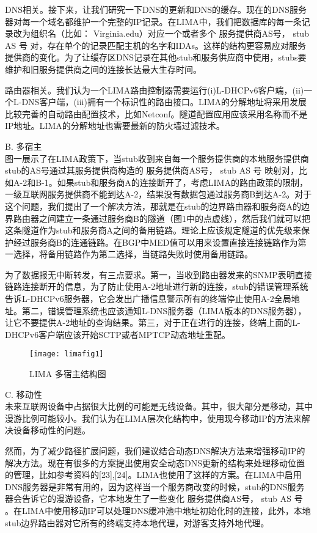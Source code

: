 DNS相关。接下来，让我们研究一下DNS的更新和DNS的缓存。现在的DNS服务器对每一个域名都维护一个完整的IP记录。在LIMA中，我们把数据库的每一条记录改为组织名（比如： Virginia.edu）对应一个或者多个 { 服务提供商AS号， stub AS 号 } 对，存在单个的记录匹配主机的名字和IDAs。这样的结构更容易应对服务提供商的变化。为了让缓存区DNS记录在其他stub和服务供应商中使用，stubs要维护和旧服务提供商之间的连接长达最大生存时间。

路由器相关。我们认为一个LIMA路由控制器需要运行(i)L-DHCPv6客户端，(ii)一个L-DNS客户端，(iii)拥有一个标识性的路由接口。LIMA的分解地址将采用发展比较完善的自动路由配置技术，比如Netconf。隧道配置应用应该采用名称而不是IP地址。LIMA的分解地址也需要最新的防火墙过滤技术。


B.	多宿主 \\
图一展示了在LIMA政策下，当stub收到来自每一个服务提供商的本地服务提供商stub的AS号通过其服务提供商构造的{ 服务提供商AS号， stub AS 号 } 映射对，比如A-2和B-1。如果stub和服务商A的连接断开了，考虑LIMA的路由政策的限制，一级互联网服务提供商不能到达A-2，结果没有数据包通过服务商B到达A-2。对于这个问题，我们提出了一个解决方法，那就是在stub的边界路由器和服务商A的边界路由器之间建立一条通过服务商B的隧道（图1中的点虚线），然后我们就可以把这条隧道作为stub和服务商A之间的备用链路。理论上应该规定隧道的优先级来保护经过服务商B的连通链路。在BGP中MED值可以用来设置直接连接链路作为第一选择，将备用链路作为第二选择，当链路失败时使用备用链路。


为了数据报无中断转发，有三点要求。第一，当收到路由器发来的SNMP表明直接链路连接断开的信息，为了防止使用A-2地址进行新的连接，stub的错误管理系统告诉L-DHCPv6服务器，它会发出广播信息警示所有的终端停止使用A-2全局地址。第二，错误管理系统也应该通知L-DNS服务器（LIMA版本的DNS服务器），让它不要提供A-2地址的查询结果。第三，对于正在进行的连接，终端上面的L-DHCPv6客户端应该开始SCTP或者MPTCP动态地址重配。

\begin{figure}
  \centering
  \texttt{[image: limafig1]}\\
  \caption{LIMA 多宿主结构图}\label{fig:limafig1}
\end{figure}

C.	移动性\\
未来互联网设备中占据很大比例的可能是无线设备。其中，很大部分是移动，其中漫游比例可能较小。我们认为在LIMA层次化结构中，使用现今移动IP的方法来解决设备移动性的问题。


然而，为了减少路径扩展问题，我们建议结合动态DNS解决方法来增强移动IP的解决方法。现在有很多的方案提出使用安全动态DNS更新的结构来处理移动位置的管理，比如参考资料的[23],[24]。LIMA也使用了这样的方案。在LIMA中启用DNS服务器是非常有用的，因为这样当一个服务商改变的时候，stub的DNS服务器会告诉它的漫游设备，它本地发生了一些变化{ 服务提供商AS号， stub AS 号 }。在LIMA中使用移动IP可以处理DNS缓冲池中地址初始化时的连接，此外，本地stub边界路由器对它所有的终端支持本地代理，对游客支持外地代理。


